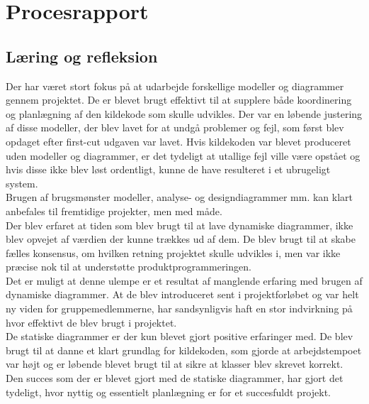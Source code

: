\chapter{Procesrapport}

\section{Læring og refleksion}
Der har været stort fokus på at udarbejde forskellige modeller og diagrammer gennem projektet. De er blevet brugt effektivt til at supplere både koordinering og planlægning af den kildekode som skulle udvikles. Der var en løbende justering af disse modeller, der blev lavet for at undgå problemer og fejl, som først blev opdaget efter first-cut udgaven var lavet. Hvis kildekoden var blevet produceret uden modeller og diagrammer, er det tydeligt at utallige fejl ville være opstået og hvis disse ikke blev løst ordentligt, kunne de have resulteret i et ubrugeligt system.\\
Brugen af brugsmønster modeller, analyse- og designdiagrammer mm. kan klart anbefales til fremtidige projekter, men med måde.\\
Der blev erfaret at tiden som blev brugt til at lave dynamiske diagrammer, ikke blev opvejet af værdien der kunne trækkes ud af dem. De blev brugt til at skabe fælles konsensus, om hvilken retning projektet skulle udvikles i, men var ikke præcise nok til at understøtte produktprogrammeringen.\\
Det er muligt at denne ulempe er et resultat af manglende erfaring med brugen af dynamiske diagrammer. At de blev introduceret sent i projektforløbet og var helt ny viden for gruppemedlemmerne, har sandsynligvis haft en stor indvirkning på hvor effektivt de blev brugt i projektet.\\
De statiske diagrammer er der kun blevet gjort positive erfaringer med. De blev brugt til at danne et klart grundlag for kildekoden, som gjorde at arbejdstempoet var højt og er løbende blevet brugt til at sikre at klasser blev skrevet korrekt. Den succes som der er blevet gjort med de statiske diagrammer, har gjort det tydeligt, hvor nyttig og essentielt planlægning er for et succesfuldt projekt.  

